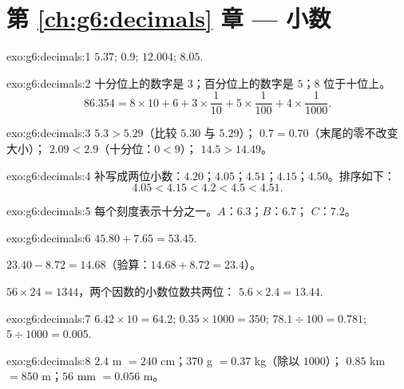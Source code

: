 \section*{第 \ref{ch:g6:decimals} 章 --- 小数}

\begin{solution}{exo:g6:decimals:1}
$5.37$; \quad $0.9$; \quad $12.004$; \quad $8.05$.
\end{solution}

\begin{solution}{exo:g6:decimals:2}
十分位上的数字是 $3$；百分位上的数字是 $5$；$8$ 位于十位上。
\[
86.354 = 8 \times 10 + 6 + 3 \times \frac{1}{10} + 5 \times
\frac{1}{100} + 4 \times \frac{1}{1000}.
\]
\end{solution}

\begin{solution}{exo:g6:decimals:3}
$5.3 > 5.29$（比较 $5.30$ 与 $5.29$）；\quad
$0.7 = 0.70$（末尾的零不改变大小）；\quad
$2.09 < 2.9$（十分位：$0 < 9$）；\quad
$14.5 > 14.49$。
\end{solution}

\begin{solution}{exo:g6:decimals:4}
补写成两位小数：$4.20$；$4.05$；$4.51$；$4.15$；$4.50$。排序如下：
\[
4.05 < 4.15 < 4.2 < 4.5 < 4.51 .
\]
\end{solution}

\begin{solution}{exo:g6:decimals:5}
每个刻度表示十分之一。$A$：$6.3$；\quad $B$：$6.7$；\quad
$C$：$7.2$。
\end{solution}

\begin{solution}{exo:g6:decimals:6}
$45.80 + 7.65 = 53.45$.

$23.40 - 8.72 = 14.68$（验算：$14.68 + 8.72 = 23.4$）。

$56 \times 24 = 1344$，两个因数的小数位数共两位：
$5.6 \times 2.4 = 13.44$.
\end{solution}

\begin{solution}{exo:g6:decimals:7}
$6.42 \times 10 = 64.2$; \quad
$0.35 \times 1000 = 350$; \quad
$78.1 \div 100 = 0.781$; \quad
$5 \div 1000 = 0.005$.
\end{solution}

\begin{solution}{exo:g6:decimals:8}
$2.4$ m $= 240$ cm；\quad $370$ g $= 0.37$ kg（除以 $1000$）；
\quad $0.85$ km $= 850$ m；\quad $56$ mm $= 0.056$ m。
\end{solution}

